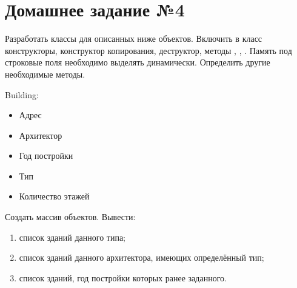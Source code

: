 \section*{Домашнее задание №4}

Разработать классы для описанных ниже объектов. Включить в класс
конструкторы, конструктор копирования, деструктор, методы ,
, . Память под строковые поля необходимо выделять
динамически. Определить другие необходимые методы.

Building:
\begin{itemize}
	\item Адрес
	\item Архитектор
	\item Год постройки
	\item Тип
	\item Количество этажей
\end{itemize}

Создать массив объектов. Вывести:
\begin{enumerate}
	\item список зданий данного типа;
	\item список зданий данного архитектора, имеющих определённый тип;
	\item список зданий, год постройки которых ранее заданного.
\end{enumerate}
